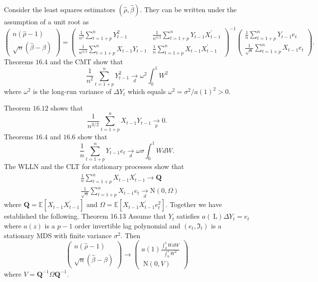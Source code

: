 \documentclass[10pt]{article}
\begin{document}
Consider the least squares estimators $(\widehat{\rho}, \widehat{\beta})$. They can be written under the assumption of a unit root as
$$
\left(\begin{array}{c}
n(\widehat{\rho}-1) \\
\sqrt{n}(\widehat{\beta}-\beta)
\end{array}\right)=\left(\begin{array}{cc}
\frac{1}{n^{2}} \sum_{t=1+p}^{n} Y_{t-1}^{2} & \frac{1}{n^{3 / 2}} \sum_{t=1+p}^{n} Y_{t-1} X_{t-1}^{\prime} \\
\frac{1}{n^{3 / 2}} \sum_{t=1+p}^{n} X_{t-1} Y_{t-1} & \frac{1}{n} \sum_{t=1+p}^{n} X_{t-1} X_{t-1}^{\prime}
\end{array}\right)^{-1}\left(\begin{array}{c}
\frac{1}{n} \sum_{t=1+p}^{n} Y_{t-1} e_{t} \\
\frac{1}{\sqrt{n}} \sum_{t=1+p}^{n} X_{t-1} e_{t}
\end{array}\right) .
$$
Theorems $16.4$ and the CMT show that
$$
\frac{1}{n^{2}} \sum_{t=1+p}^{n} Y_{t-1}^{2} \underset{d}{\rightarrow} \omega^{2} \int_{0}^{1} W^{2}
$$
where $\omega^{2}$ is the long-run variance of $\Delta Y_{t}$ which equals $\omega^{2}=\sigma^{2} / a(1)^{2}>0$.

Theorem $16.12$ shows that
$$
\frac{1}{n^{3 / 2}} \sum_{t=1+p}^{n} X_{t-1} Y_{t-1} \underset{p}{\longrightarrow} 0 .
$$
Theorems $16.4$ and $16.6$ show that
$$
\frac{1}{n} \sum_{t=1+p}^{n} Y_{t-1} e_{t} \underset{d}{\longrightarrow} \omega \sigma \int_{0}^{1} W d W .
$$
The WLLN and the CLT for stationary processes show that
$$
\begin{aligned}
&\frac{1}{n} \sum_{t=1+p}^{n} X_{t-1} X_{t-1}^{\prime} \rightarrow \boldsymbol{Q} \\
&\frac{1}{\sqrt{n}} \sum_{t=1+p}^{n} X_{t-1} e_{t} \underset{d}{\longrightarrow} \mathrm{N}(0, \Omega)
\end{aligned}
$$
where $\boldsymbol{Q}=\mathbb{E}\left[X_{t-1} X_{t-1}^{\prime}\right]$ and $\Omega=\mathbb{E}\left[X_{t-1} X_{t-1}^{\prime} e_{t}^{2}\right]$. Together we have established the following. Theorem 16.13 Assume that $Y_{t}$ satisfies $a(\mathrm{~L}) \Delta Y_{t}=e_{t}$ where $a(z)$ is a $p-1$ order invertible lag polynomial and $\left(e_{t}, \Im_{t}\right)$ is a stationary MDS with finite variance $\sigma^{2}$. Then
$$
\left(\begin{array}{c}
n(\widehat{\rho}-1) \\
\sqrt{n}(\widehat{\beta}-\beta)
\end{array}\right) \rightarrow\left(\begin{array}{c}
a(1) \frac{\int_{0}^{1} W d W}{\int_{0}^{1} W^{2}} \\
\mathrm{~N}(0, V)
\end{array}\right)
$$
where $V=\boldsymbol{Q}^{-1} \Omega \boldsymbol{Q}^{-1}$.
\end{document}
